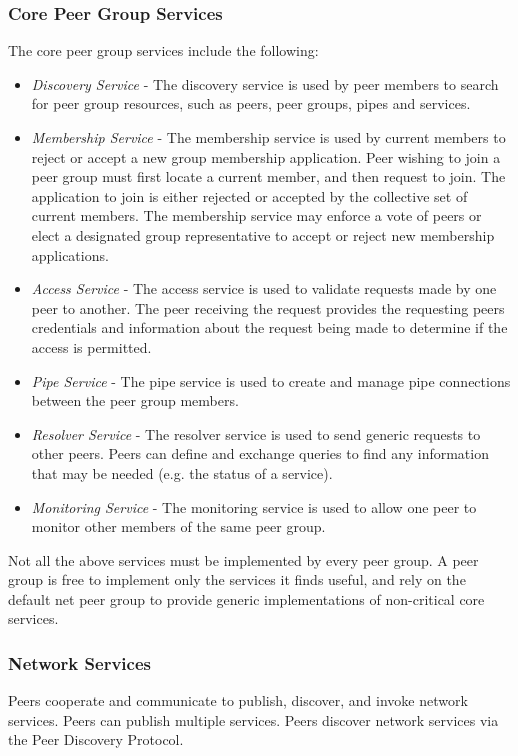 \subsubsection{Core Peer Group Services}
The core peer group services include the following:
\begin{itemize}
 \item \emph{Discovery Service} - The discovery service is used by peer members to search for peer group resources, such as peers, peer groups, pipes and services.
 \item \emph{Membership Service} - The membership service is used by current members to reject or accept a new group membership application. Peer wishing to join a peer group must first locate a current member, and then request to join. The application to join is either rejected or accepted by the collective set of current members. The membership service may enforce a vote of peers or elect a designated group representative to accept or reject new membership applications.
 \item \emph{Access Service} - The access service is used to validate requests made by one peer to another. The peer receiving the request provides the requesting peers credentials and information about the request being made to determine if the access is permitted.
 \item \emph{Pipe Service} - The pipe service is used to create and manage pipe connections between the peer group members.
 \item \emph{Resolver Service} - The resolver service is used to send generic requests to other peers. Peers can define and exchange queries to find any information that may be needed (e.g. the status of a service).
 \item \emph{Monitoring Service} - The monitoring service is used to allow one peer to monitor other members of the same peer group.
\end{itemize}

Not all the above services must be implemented by every peer group. A peer group is free to implement only the services it finds useful, and rely on the default net peer group to provide generic implementations of non-critical core services.

\subsubsection{Network Services}
Peers cooperate and communicate to publish, discover, and invoke network services. Peers can publish multiple services. Peers discover network services via the Peer Discovery Protocol. 

